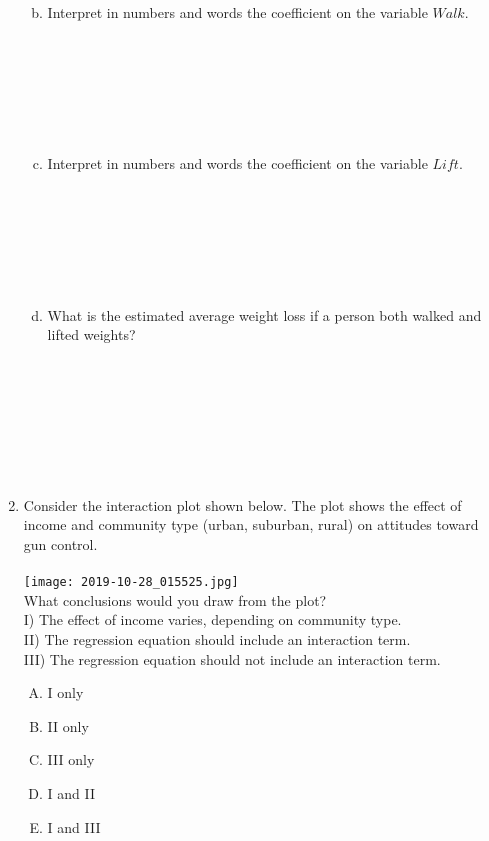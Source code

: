 \documentclass[12pt]{article}
\begin{document}
\begin{enumerate}[(1)]
\begin{enumerate}[(a)]
\\
\\
\item Interpret in numbers and words the coefficient on the variable $Walk$.\\
\\
\\
\\
\\
\\
\\
\item Interpret in numbers and words the coefficient on the variable $Lift$.\\
\\
\\
\\
\\
\\
\\
\item What is the estimated average weight loss if a person both walked and lifted weights?\\
\\
\\
\\
\\
\\
\\
\\
\end{enumerate}
\pagebreak
\item Consider the interaction plot shown below. The plot shows the effect of income and community type (urban, suburban, rural) on attitudes toward gun control.\\
\\
\texttt{[image: 2019-10-28\_015525.jpg]}
\\

What conclusions would you draw from the plot?\\
I)   The effect of income varies, depending on community type.\\
II)  The regression equation should include an interaction term.\\
III) The regression equation should not include an interaction term.
\begin{enumerate}[(A)]
\item I only
\item II only
\item III only
\item I and II
\item I and III
\end{enumerate}

\end{enumerate}
\end{document}

